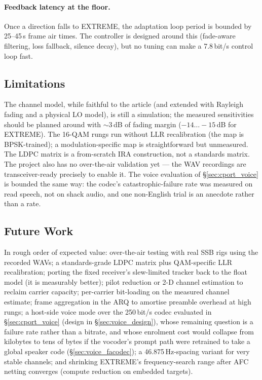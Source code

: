 \paragraph{Feedback latency at the floor.}  Once a direction falls to
EXTREME, the adaptation loop period is bounded by 25--45\,s frame air
times.  The controller is designed around this (fade-aware filtering,
loss fallback, silence decay), but no tuning can make a 7.8\,bit/s
control loop fast.

\subsection{Limitations}

The channel model, while faithful to the article (and extended with
Rayleigh fading and a physical LO model), is still a simulation; the
measured sensitivities should be planned around with $\sim$3\,dB of
fading margin ($-14\ldots-15$\,dB for EXTREME).  The 16-QAM rungs run
without LLR recalibration (the map is BPSK-trained); a
modulation-specific map is straightforward but unmeasured.  The LDPC
matrix is a from-scratch IRA construction, not a standards matrix.
The project also has no over-the-air validation yet --- the WAV
recordings are transceiver-ready precisely to enable it.  The voice
evaluation of \S\ref{sec:cport_voice} is bounded the same way: the
codec's catastrophic-failure rate was measured on read speech, not on
shack audio, and one non-English trial is an anecdote rather than a
rate.

\subsection{Future Work}

In rough order of expected value: over-the-air testing with real SSB
rigs using the recorded WAVs; a standards-grade LDPC matrix plus
QAM-specific LLR recalibration; porting the fixed receiver's
slew-limited tracker back to the float model (it is measurably
better); pilot reduction or 2-D channel estimation to reclaim carrier
capacity; per-carrier bit-loading on the measured channel estimate;
frame aggregation in the ARQ to amortise preamble overhead at high
rungs; a host-side voice mode over the 250\,bit/s codec evaluated in
\S\ref{sec:cport_voice} (design in \S\ref{sec:voice_design}), whose
remaining question is a failure rate rather than a bitrate, and whose
enrolment cost would collapse from kilobytes to tens of bytes if the
vocoder's prompt path were retrained to take a global speaker code
(\S\ref{sec:voice_facodec}); a 46.875\,Hz-spacing variant for very stable channels; and
shrinking EXTREME's frequency-search range after AFC netting
converges (compute reduction on embedded targets).
